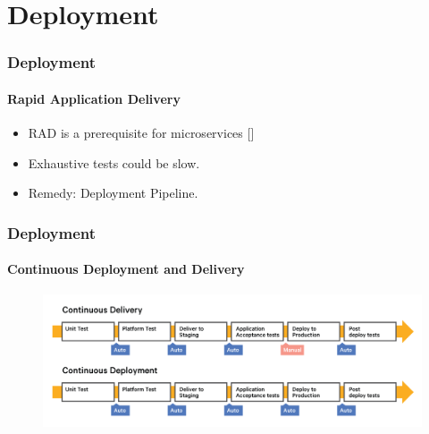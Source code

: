 \documentclass{beamer}
\begin{document}
\section{Deployment}

\begin{frame}
	\frametitle{Deployment}
	\framesubtitle{Rapid Application Delivery}
	\begin{itemize}
		\item RAD is a prerequisite for microservices []
		\item Exhaustive tests could be slow.
		\item Remedy: Deployment Pipeline.
	\end{itemize}
\end{frame}


\begin{frame}
	\frametitle{Deployment}
	\framesubtitle{Continuous Deployment and Delivery}
	\begin{figure}
		\begin{center}
			\includegraphics[scale=0.5]{delivery}
		\end{center}
	\end{figure}
\end{frame}
\end{document}
